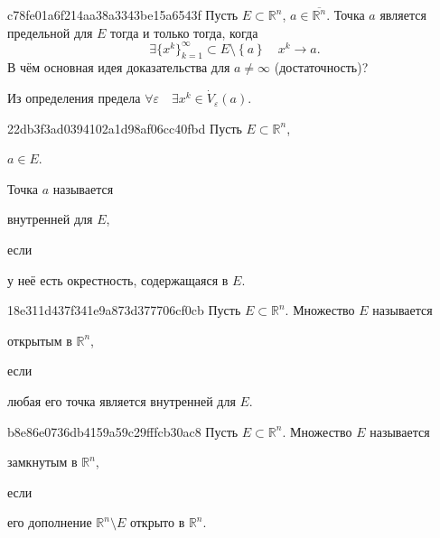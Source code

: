 \begin{note}{c78fe01a6f214aa38a3343be15a6543f}
    Пусть \({ E \subset \mathbb R^{n} }\),\: \({ a \in \overline{\mathbb R^{n}} }\). Точка \({ a }\) является предельной для \({ E }\) тогда и только тогда, когда
    \[
        \exists \{ x^{k} \}_{k = 1}^{\infty} \subset E \setminus \left\{ a \right\} \quad x^{k} \to a.
    \]
    В чём основная идея доказательства для \({ a \neq \infty }\) (достаточность)?

    \begin{cloze}{1}
        Из определения предела \({ \forall \varepsilon \quad \exists x^{k} \in \dot V_{\varepsilon}(a) }\).
    \end{cloze}
\end{note}

\begin{note}{22db3f3ad0394102a1d98af06cc40fbd}
    Пусть \({ E \subset \mathbb R^{n} }\),\: \begin{icloze}{3}\({ a \in E }\).\end{icloze}
    Точка \({ a }\) называется \begin{icloze}{2}внутренней для \({ E }\),\end{icloze} если \begin{icloze}{1}у неё есть окрестность, содержащаяся в \({ E }\).\end{icloze}
\end{note}

\begin{note}{18e311d437f341e9a873d377706cf0cb}
    Пусть \({ E \subset \mathbb R^{n} }\).
    Множество \({ E }\) называется \begin{icloze}{2}открытым в \({ \mathbb R^{n} }\),\end{icloze} если \begin{icloze}{1}любая его точка является внутренней для \({ E }\).\end{icloze}
\end{note}

\begin{note}{b8e86e0736db4159a59c29fffcb30ac8}
    Пусть \({ E \subset \mathbb R^{n} }\).
    Множество \({ E }\) называется \begin{icloze}{2}замкнутым в \({ \mathbb R^{n} }\),\end{icloze} если \begin{icloze}{1}его дополнение \({ \mathbb R^{n} \setminus E }\) открыто в \({ \mathbb R^{n} }\).\end{icloze}
\end{note}


